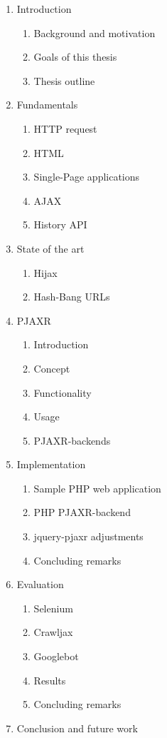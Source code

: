 \documentclass[f,bachelor,binding,twoside,palatino]{WeSTthesis}
\def \ajax {AJAX}
\def \pjaxr {PJAXR}
\def \jqueryPjaxr {jquery-pjaxr}
\def \httpRequest {HTTP request}
\begin{document}
\begin{enumerate}
  \item Introduction
  \begin{enumerate}[label*=\arabic*.]
    \item Background and motivation
    \item Goals of this thesis
    \item Thesis outline
  \end{enumerate}
  \item Fundamentals
  \begin{enumerate}[label*=\arabic*.]
    \item \httpRequest{}
    \item HTML
    \item Single-Page applications
    \item \ajax{}
    \item History API
  \end{enumerate}
  \item State of the art
  \begin{enumerate}[label*=\arabic*.]
    \item Hijax
    \item Hash-Bang URLs
  \end{enumerate}
  \item \pjaxr{}
  \begin{enumerate}[label*=\arabic*.]
    \item Introduction
    \item Concept
    \item Functionality
    \item Usage
    \item \pjaxr{}-backends
  \end{enumerate}
  \item Implementation
  \begin{enumerate}[label*=\arabic*.]
    \item Sample PHP web application
    \item PHP \pjaxr{}-backend
    \item \jqueryPjaxr{} adjustments
    \item Concluding remarks
  \end{enumerate}
  \item Evaluation
  \begin{enumerate}[label*=\arabic*.]
    \item Selenium
    \item Crawljax
    \item Googlebot
    \item Results
    \item Concluding remarks
  \end{enumerate}
  \item Conclusion and future work

\end{enumerate}
\end{document}
